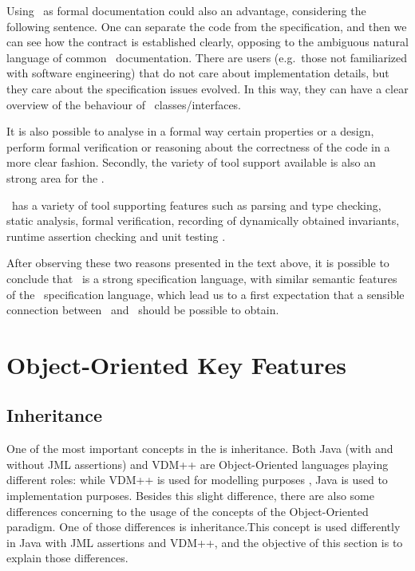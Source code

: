 Using \jml\ as formal documentation could also an advantage, considering the following sentence. 
One can separate the code from the specification, and then we can 
see how the contract is established clearly, opposing to the ambiguous natural language of common \java\ documentation.
There are users (e.g.\ those not familiarized with software engineering) that do not care about implementation details, 
but they care about the specification issues evolved. In this 
way, they can have a clear overview of the behaviour of \java\ classes/interfaces.

It is also possible to analyse in a formal way certain properties or a design, perform formal verification or reasoning about the 
correctness of the code in a more clear fashion.
Secondly, the variety of tool support available is also an strong area for the \jml.

\jml\ has a variety of tool supporting features such as parsing and type checking, static analysis, formal verification, 
recording of dynamically obtained invariants, runtime assertion checking and unit testing \cite{leavens-Cheon-Cok05}.

After observing these two reasons presented in the text above, it is possible to conclude that \jml\ is a strong specification language, 
with similar semantic features of the \vpp\ specification language, which lead us to a first expectation that a 
sensible connection between \jml\ and \vpp\ should be possible to obtain.

\section{Object-Oriented Key Features}

\subsection{Inheritance}
\label{chap2:sec:inh}

One of the most important concepts in the  is inheritance. Both Java (with and without JML assertions) and VDM++ are Object-Oriented languages playing different roles: while VDM++ is used for modelling purposes \cite{Fitzgerald&05}, Java is used to implementation purposes. Besides this slight difference, there are also some differences concerning to  the usage of the concepts of the Object-Oriented paradigm. One of those differences is inheritance.This concept is used differently in Java with JML assertions and VDM++, and the objective of this section is to explain those differences.

